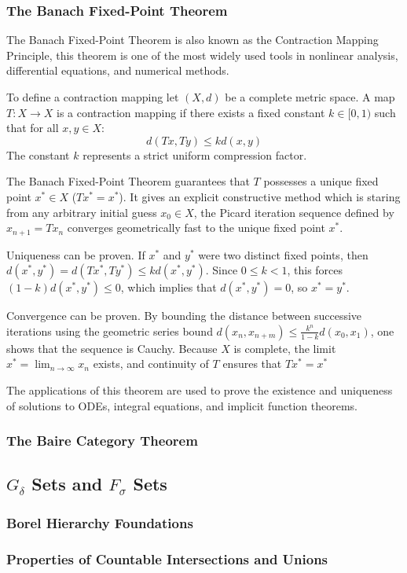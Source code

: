 \documentclass[10pt,a4paper]{article}
\begin{document}
			\subsubsection{The Banach Fixed-Point Theorem}
			The Banach Fixed-Point Theorem is also known as the Contraction Mapping Principle, this theorem is one of the most widely used tools in nonlinear analysis, differential equations, and numerical methods.
			
			To define a contraction mapping let $(X,d)$ be a complete metric space. A map $T:X\to X$ is a contraction mapping if there exists a fixed constant $k\in[0,1)$ such that for all $x,y\in X$: $$d(Tx,Ty)\leq kd(x,y)$$ The constant $k$ represents a strict uniform compression factor.
			
			The Banach Fixed-Point Theorem guarantees that $T$ possesses a unique fixed point $x^*\in X$ ($Tx^* = x^*$). It gives an explicit constructive method which is staring from any arbitrary initial guess $x_0\in X$, the Picard iteration sequence defined by $x_{n+1}=Tx_n$ converges geometrically fast to the unique fixed point $x^*$.
			
			Uniqueness can be proven. If $x^*$ and $y^*$ were two distinct fixed points, then $d(x^*,y^*)=d(Tx^*,Ty^*)\leq kd(x^*,y^*)$. Since $0\leq k< 1$, this forces $(1-k)d(x^*,y^*)\leq 0$, which implies that $d(x^*,y^*)=0$, so $x^*=y^*$.
			
			Convergence can be proven. By bounding the distance between successive iterations using the geometric series bound $d(x_n,x_{n+m})\leq \frac{k^n}{1-k}d(x_0,x_1)$, one shows that the sequence is Cauchy. Because $X$ is complete, the limit $x^* = \lim_{n\to\infty}x_n$ exists, and continuity of $T$ ensures that $Tx^*=x^*$
			
			The applications of this theorem are used to prove the existence and uniqueness of solutions to ODEs, integral equations, and implicit function theorems.
			\subsubsection{The Baire Category Theorem}
		\subsection{$G_\delta$ Sets and $F_\sigma$ Sets}
			\subsubsection{Borel Hierarchy Foundations}
			\subsubsection{Properties of Countable Intersections and Unions}
\end{document}
